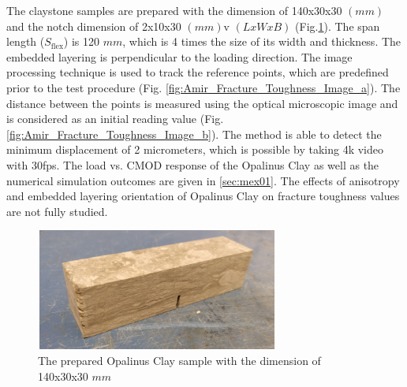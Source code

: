 The claystone samples are prepared with the dimension of 140x30x30 $(mm)$ and the notch dimension of 2x10x30 $(mm)$v $(LxWxB)$  (Fig.\ref{fig:Amir_Fracture_Toughness_Sample}). The span length ($S_\text{flex}$) is 120 $mm$, which is 4 times the size of its width and thickness. The embedded layering is perpendicular to the loading direction. The image processing technique is used to track the reference points, which are predefined prior to the test procedure (Fig. \ref{fig:Amir_Fracture_Toughness_Image_a}). The distance between the points is measured using the optical microscopic image and is considered as an initial reading value (Fig. \ref{fig:Amir_Fracture_Toughness_Image_b}). The method is able to detect the minimum displacement of 2 micrometers, which is possible by taking 4k video with 30fps. The load vs. CMOD response of the Opalinus Clay as well as the numerical simulation outcomes are given in \ref{sec:mex01}. The effects of anisotropy and embedded layering orientation of Opalinus Clay on fracture toughness values are not fully studied. 

\begin{figure}[!ht]
\centering
\includegraphics[width=8cm,height=4cm]{figures/Amir_Fracture_Toughness_Sample.png}
\caption{The prepared Opalinus Clay sample with the dimension of 140x30x30 $mm$}
\label{fig:Amir_Fracture_Toughness_Sample}
\end{figure} 

